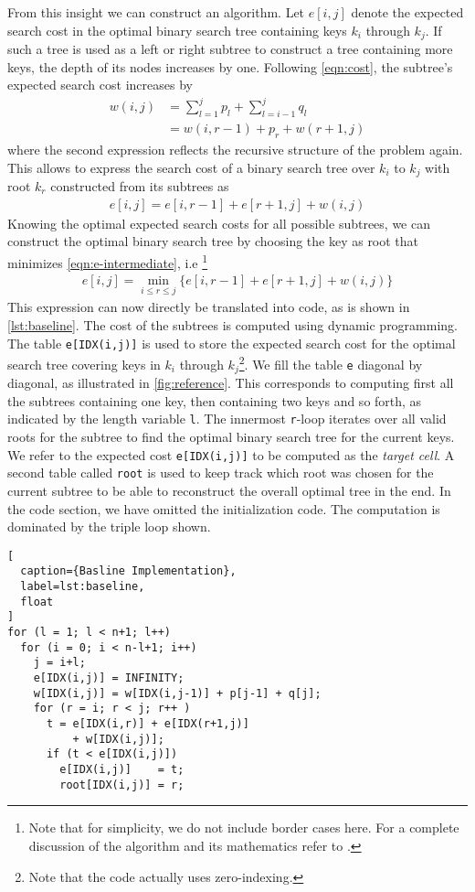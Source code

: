 From this insight we can construct an algorithm. Let $e[i,j]$ denote the
expected search cost in the optimal binary search tree containing keys
$k_i$ through $k_j$. If such a tree is used as a left or right subtree to
construct a tree containing more keys, the depth of its nodes increases by
one. Following \autoref{eqn:cost}, the subtree's expected search cost
increases by
\begin{align}
  w(i,j) &= \sum_{l=1}^j p_l + \sum_{l=i-1}^j q_l \nonumber\\
         &= w(i,r-1) + p_r + w(r+1,j)
  \label{eqn:w}
\end{align}
where the second expression reflects the recursive structure of the problem
again. This allows to express the search cost of a binary search tree over
$k_i$ to $k_j$ with root $k_r$ constructed from its subtrees as
\begin{align}
  e[i,j] = e[i,r-1] + e[r+1,j] + w(i,j)
  \label{eqn:e-intermediate}
\end{align}
Knowing the optimal expected search costs for all possible subtrees, we can
construct the optimal binary search tree by choosing the key as root that
minimizes \autoref{eqn:e-intermediate}, i.e
\footnote{Note that for simplicity, we do not include border cases here.
For a complete discussion of the algorithm and its mathematics refer to
\cite{MITBook}.}
\begin{align}
  e[i,j] = \min_{i\leq r\leq j} \{e[i,r-1] + e[r+1,j] + w(i,j)\}
  \label{eqn:e}
\end{align}
This expression can now directly be translated into code, as is shown in
\autoref{lst:baseline}. The cost of the subtrees is computed using dynamic
programming. The table \texttt{e[IDX(i,j)]} is used to store the
expected search cost for the optimal search tree covering keys in $k_i$
through $k_j$\footnote{Note that the code actually uses zero-indexing.}. We
fill the table \texttt{e} diagonal by diagonal, as illustrated in
\autoref{fig:reference}. This corresponds to computing first all the
subtrees containing one key, then containing two keys and so forth, as
indicated by the length variable \texttt{l}. The innermost \texttt{r}-loop
iterates over all valid roots for the subtree to find the optimal binary
search tree for the current keys. We refer to the expected cost
\texttt{e[IDX(i,j)]} to be computed as the \emph{target cell}. A second
table called \texttt{root} is used to keep track which root was chosen for
the current subtree to be able to reconstruct the overall optimal tree in
the end. In the code section, we have omitted the initialization code. The
computation is dominated by the triple loop shown.
\begin{lstlisting}[
  caption={Basline Implementation},
  label=lst:baseline,
  float
]
for (l = 1; l < n+1; l++)
  for (i = 0; i < n-l+1; i++)
    j = i+l;
    e[IDX(i,j)] = INFINITY;
    w[IDX(i,j)] = w[IDX(i,j-1)] + p[j-1] + q[j];
    for (r = i; r < j; r++ )
      t = e[IDX(i,r)] + e[IDX(r+1,j)]
          + w[IDX(i,j)];
      if (t < e[IDX(i,j)])
        e[IDX(i,j)]    = t;
        root[IDX(i,j)] = r;
\end{lstlisting}

